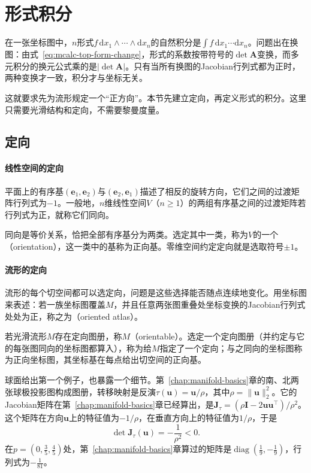\section{形式积分}
\label{sec:mcalc-form-integration}

在一张坐标图中，$n$形式$f\,\mathrm dx_1\wedge\cdots\wedge\mathrm dx_n$的自然积分是$\int f\,\mathrm dx_1\cdots\mathrm dx_n$。问题出在换图：由式~\eqref{eq:mcalc-top-form-change}，形式的系数按带符号的$\det\bm A$变换，而多元积分的换元公式乘的是$\lvert\det\bm A\rvert$。只有当所有换图的Jacobian行列式都为正时，两种变换才一致，积分才与坐标无关。

这就要求先为流形规定一个“正方向”。本节先建立定向，再定义形式的积分。这里只需要光滑结构和定向，不需要黎曼度量。

\subsection{定向}
\label{sec:mcalc-orientation}

\paragraph{线性空间的定向}
平面上的有序基$(\bm e_1,\bm e_2)$与$(\bm e_2,\bm e_1)$描述了相反的旋转方向，它们之间的过渡矩阵行列式为$-1$。一般地，$n$维线性空间$V$（$n\geq1$）的两组有序基之间的过渡矩阵若行列式为正，就称它们同向。

同向是等价关系，恰把全部有序基分为两类。选定其中一类，称为$V$的一个（orientation），这一类中的基称为正向基。零维空间约定定向就是选取符号$\pm1$。

\paragraph{流形的定向}
流形的每个切空间都可以选定向，问题是这些选择能否随点连续地变化。用坐标图来表述：若一族坐标图覆盖$M$，并且任意两张图重叠处坐标变换的Jacobian行列式处处为正，称之为（oriented atlas）。

\begin{definition}[可定向流形]
\label{def:mcalc-orientable}
若光滑流形$M$存在定向图册，称$M$（orientable）。选定一个定向图册（并约定与它的每张图同向的坐标图都算入），称为给$M$指定了一个定向；与之同向的坐标图称为正向坐标图，其坐标基在每点给出切空间的正向基。
\end{definition}

球面给出第一个例子，也暴露一个细节。第~\ref{chap:manifold-basics}章的南、北两张球极投影图构成图册，转移映射是反演$\tau(\bm u)=\bm u/\rho$，其中$\rho=\lVert\bm u\rVert_2^2$。它的Jacobian矩阵在第~\ref{chap:manifold-basics}章已经算出，是$\bm J_\tau=(\rho\bm I-2\bm u\bm u^\top)/\rho^2$。这个矩阵在方向$\bm u$上的特征值为$-1/\rho$，在垂直方向上的特征值为$1/\rho$，于是
\[
\det\bm J_\tau(\bm u)=-\frac1{\rho^2}<0 .
\]
在$p=(0,\tfrac35,\tfrac45)$处，第~\ref{chap:manifold-basics}章算过的矩阵是$\operatorname{diag}(\tfrac19,-\tfrac19)$，行列式为$-\tfrac1{81}$。

